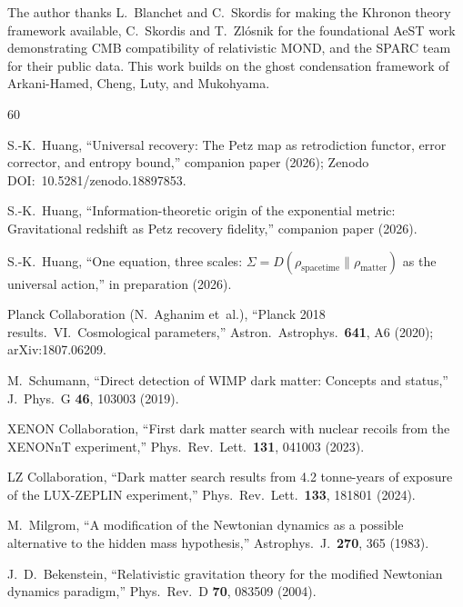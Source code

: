 \documentclass[prd,twocolumn,superscriptaddress,longbibliography,floatfix]{revtex4-2}
\begin{document}
\begin{acknowledgments}
The author thanks L.~Blanchet and C.~Skordis for making the
Khronon theory framework available, C.~Skordis and T.~Zl\'{o}snik
for the foundational AeST work demonstrating CMB compatibility
of relativistic MOND, and the SPARC team for their public data.
This work builds on the ghost condensation framework of
Arkani-Hamed, Cheng, Luty, and Mukohyama.
\end{acknowledgments}



\begin{thebibliography}{60}

S.-K.~Huang,
``Universal recovery: The Petz map as retrodiction functor,
error corrector, and entropy bound,''
companion paper (2026);
Zenodo DOI:~10.5281/zenodo.18897853.

S.-K.~Huang,
``Information-theoretic origin of the exponential metric:
Gravitational redshift as Petz recovery fidelity,''
companion paper (2026).

S.-K.~Huang,
``One equation, three scales: $\Sigma = D(\rho_{\mathrm{spacetime}}
\| \rho_{\mathrm{matter}})$ as the universal action,''
in preparation (2026).

Planck Collaboration (N.~Aghanim et~al.),
``Planck 2018 results.\ VI.\ Cosmological parameters,''
Astron.\ Astrophys.\ \textbf{641}, A6 (2020);
arXiv:1807.06209.

M.~Schumann,
``Direct detection of WIMP dark matter: Concepts and status,''
J.\ Phys.\ G \textbf{46}, 103003 (2019).

XENON Collaboration,
``First dark matter search with nuclear recoils from the
XENONnT experiment,''
Phys.\ Rev.\ Lett.\ \textbf{131}, 041003 (2023).

LZ Collaboration,
``Dark matter search results from 4.2 tonne-years of exposure
of the LUX-ZEPLIN experiment,''
Phys.\ Rev.\ Lett.\ \textbf{133}, 181801 (2024).

M.~Milgrom,
``A modification of the Newtonian dynamics as a possible
alternative to the hidden mass hypothesis,''
Astrophys.\ J.\ \textbf{270}, 365 (1983).

J.~D.~Bekenstein,
``Relativistic gravitation theory for the modified Newtonian
dynamics paradigm,''
Phys.\ Rev.\ D \textbf{70}, 083509 (2004).


\end{thebibliography}
\end{document}
